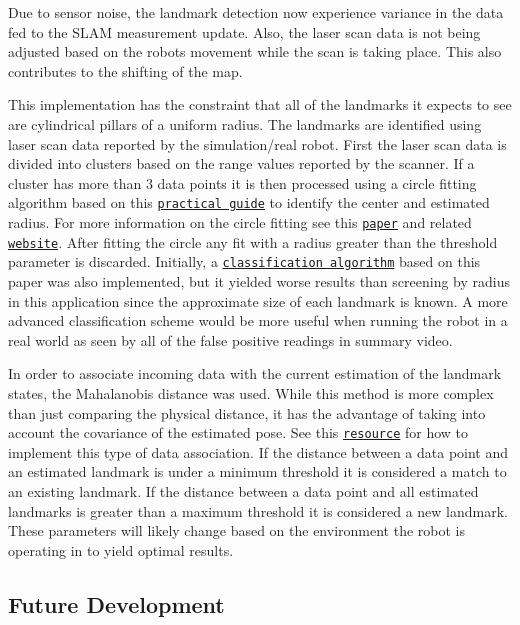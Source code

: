  Due to sensor noise, the landmark detection now experience variance in the data fed to the S\+L\+AM measurement update. Also, the laser scan data is not being adjusted based on the robot\textquotesingle{}s movement while the scan is taking place. This also contributes to the shifting of the map.

This implementation has the constraint that all of the landmarks it expects to see are cylindrical pillars of a uniform radius. The landmarks are identified using laser scan data reported by the simulation/real robot. First the laser scan data is divided into clusters based on the range values reported by the scanner. If a cluster has more than 3 data points it is then processed using a circle fitting algorithm based on this \href{https://nu-msr.github.io/navigation_site/circle_fit.html}{\tt practical guide} to identify the center and estimated radius. For more information on the circle fitting see this \href{https://projecteuclid.org/euclid.ejs/1251119958}{\tt paper} and related \href{https://people.cas.uab.edu/~mosya/cl/CPPcircle.html}{\tt website}. After fitting the circle any fit with a radius greater than the threshold parameter is discarded. Initially, a \href{http://miarn.sourceforge.net/pdf/a1738b.pdf}{\tt classification algorithm} based on this paper was also implemented, but it yielded worse results than screening by radius in this application since the approximate size of each landmark is known. A more advanced classification scheme would be more useful when running the robot in a real world as seen by all of the false positive readings in summary video.

 In order to associate incoming data with the current estimation of the landmark states, the Mahalanobis distance was used. While this method is more complex than just comparing the physical distance, it has the advantage of taking into account the covariance of the estimated pose. See this \href{https://nu-msr.github.io/navigation_site/data_assoc.html}{\tt resource} for how to implement this type of data association. If the distance between a data point and an estimated landmark is under a minimum threshold it is considered a match to an existing landmark. If the distance between a data point and all estimated landmarks is greater than a maximum threshold it is considered a new landmark. These parameters will likely change based on the environment the robot is operating in to yield optimal results.

\subsection*{Future Development}


